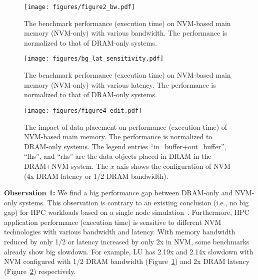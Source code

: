 
\begin{figure}[!t]
    \centering
    \texttt{[image: figures/figure2\_bw.pdf]}
    \caption{The benchmark performance (execution time) on NVM-based main memory (NVM-only) with various bandwidth. The performance is normalized to that of DRAM-only systems.} 
    \label{fig:bg_bw_sensitivity}
\end{figure}

\begin{figure}[!t]
    \centering
    \texttt{[image: figures/bg\_lat\_sensitivity.pdf]}
	    \caption{The benchmark performance (execution time) on NVM-based main memory (NVM-only) with various latency. The performance is normalized to that of DRAM-only systems.} 
    \label{fig:bg_lat_sensitivity}
\end{figure}

\begin{figure}[!t]
    \centering
    \texttt{[image: figures/figure4\_edit.pdf]}
    \caption{The impact of data placement on performance (execution time) of NVM-based main memory. The performance is normalized to DRAM-only systems. The legend entries ``in\_buffer+out\_buffer'', ``lhs'', and ``rhs'' are the data objects placed in DRAM in the DRAM+NVM system. The $x$ axis shows the configuration of NVM (4x DRAM latency or 1/2 DRAM bandwidth).}
    \label{fig:bg_data_placement_impact}
    \vspace{-15pt}
\end{figure}

\textbf{Observation 1:}
We find a big performance gap between DRAM-only and NVM-only systems.
This observation is contrary to an existing conclusion (i.e., no big gap) for HPC workloads 
based on a single node simulation~\cite{nvm_ipdps12}.
Furthermore, HPC application performance (execution time) is sensitive to different NVM technologies with various bandwidth and latency. With memory bandwidth reduced by only 1/2 or latency increased by only 2x in NVM, some benchmarks already show big slowdown. For example, LU has 2.19x and 2.14x slowdown with NVM configured with 1/2 DRAM bandwidth (Figure~\ref{fig:bg_bw_sensitivity}) and 2x DRAM latency (Figure~\ref{fig:bg_lat_sensitivity}) respectively.

